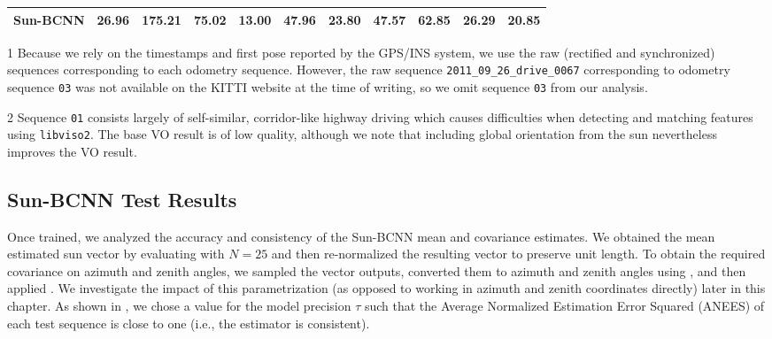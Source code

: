 \begin{table}[]
{\begin{threeparttable}
\begin{tabular}{@{}lcccccccccc@{}}
\quad Sun-BCNN    & 26.96          & \textbf{175.21} & 75.02          & 13.00          & \textbf{47.96} & 23.80          & \textbf{47.57} & 62.85          & 26.29          & 20.85          \\ \bottomrule
\end{tabular}
\begin{tablenotes}
	\item[1] Because we rely on the timestamps and first pose reported by the GPS/INS system, we use the raw (rectified and synchronized) sequences corresponding to each odometry sequence. However, the raw sequence \texttt{2011\_09\_26\_drive\_0067} corresponding to odometry sequence \texttt{03} was not available on the KITTI website at the time of writing, so we omit sequence \texttt{03} from our analysis.
    \item[2] Sequence \texttt{01} consists largely of self-similar, corridor-like highway driving which causes difficulties when detecting and matching features using \texttt{libviso2}. The base VO result is of low quality, although we note that including global orientation from the sun nevertheless improves the VO result.
\end{tablenotes}
\end{threeparttable}
}
\end{table}

\subsection{Sun-BCNN Test Results}
Once trained, we analyzed the accuracy and consistency of the Sun-BCNN mean and covariance estimates.
We obtained the mean estimated sun vector by evaluating  with $N=25$ and then re-normalized the resulting vector to preserve unit length. 
To obtain the required covariance on azimuth and zenith angles, we sampled the vector outputs, converted them to azimuth and zenith angles using , and then applied .
We investigate the impact of this parametrization (as opposed to working in azimuth and zenith coordinates directly) later in this chapter.
As shown in , we chose a value for the model precision $\tau$ such that the Average Normalized Estimation Error Squared (ANEES) of each test sequence is close to one (i.e., the estimator is consistent).

